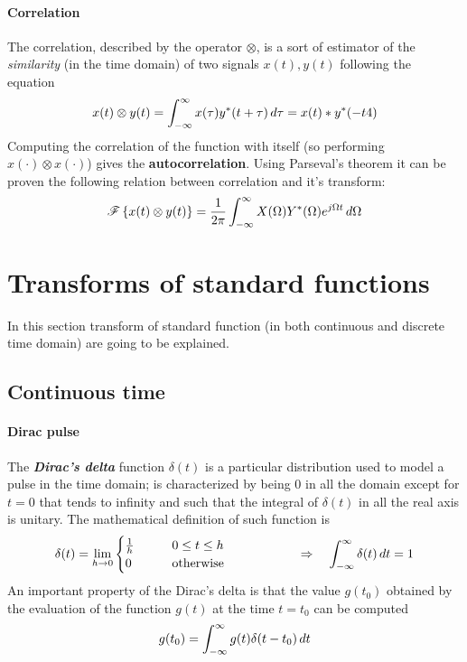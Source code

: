 		\paragraph{Correlation} The correlation, described by the operator $\otimes$, is a sort of estimator of the \textit{similarity} (in the time domain) of two signals $x(t),y(t)$ following the equation
		\begin{equation} \label{eq:four:correlation}
			x(t) \otimes y(t) = \int_{-\infty}^\infty x(\tau) y^*(t+\tau)\, d\tau = x(t) * y^*(-t4)
		\end{equation}
		Computing the correlation of the function with itself (so performing $x(\cdot)\otimes x(\cdot)$) gives the \textbf{autocorrelation}. Using Parseval's theorem it can be proven the following relation between correlation and it's transform:
		\begin{equation}
			\mathscr{F}\left\{ x(t)\otimes y(t) \right\} = \frac 1{2\pi} \int_{-\infty}^\infty X(\Omega) Y^*(\Omega) e^{j\Omega t} \, d\Omega
		\end{equation}
	
\section{Transforms of standard functions}
	In this section transform of standard function (in both continuous and discrete time domain) are going to be explained.
	
\subsection{Continuous time}
	\paragraph{Dirac pulse} The \textbf{\textit{Dirac's delta}} function $\delta(t)$ is a particular distribution used to model a pulse in the time domain; is characterized by being 0 in all the domain except for $t=0$ that tends to infinity and such that the integral of $\delta(t)$ in all the real axis is unitary. The mathematical definition of such function is
	\begin{equation}
		\delta(t) = \lim_{h\rightarrow 0} \begin{cases}
			\frac 1 h \qquad & 0\leq t \leq h \\
			0 & \textrm{otherwise}
		\end{cases}  \hspace{2cm} \Rightarrow \quad \int_{-\infty}^\infty \delta(t)\, dt = 1
	\end{equation}
	An important property of the Dirac's delta is that the value $g(t_0)$ obtained by the evaluation of the function $g(t)$ at the time $t=t_0$ can be computed 
	\[ g(t_0) = \int_{-\infty}^\infty g(t)\delta(t-t_0) \, dt \]
	
